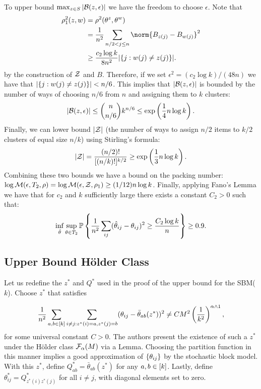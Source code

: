 \documentclass[11pt]{article}
\begin{document}
To upper bound $\max_{z \in S} |\mathcal{B}(z, \epsilon)|$ we have the freedom to choose $\epsilon$. Note that
\begin{equation}
\begin{aligned}
\rho_1^2(z, w) &= \rho^2(\theta^z, \theta^w) \\
               &= \frac{1}{n^2} \sum_{n/2 < j \leq n}\norm{B_{z(j)} - B_{w(j)}}^2 \\
               &\geq \frac{c_2 \log k}{8 n^2} |\set{j : w(j) \neq z(j)}|.
\end{aligned}
\end{equation}
by the construction of $\mathcal{Z}$ and $B$. Therefore, if we set $\epsilon^2 = (c_2 \log k)/(48 n)$ we have that $|\{j : w(j) \neq z(j)\}| < n/6$. This implies that $|\mathcal{B}(z, \epsilon)|$ is bounded by the number of ways of choosing $n/6$ from $n$ and assigning them to $k$ clusters:
\begin{equation}
|\mathcal{B}(z, \epsilon)| \leq {n \choose n/6} k^{n/6} \leq \exp\left(\frac{1}{4} n \log k\right).
\end{equation}
Finally, we can lower bound $|\mathcal{Z}|$ (the number of ways to assign $n/2$ items to $k/2$ clusters of equal size $n/k$) using Stirling's formula:
\begin{equation}
|\mathcal{Z}| = \frac{(n/2)!}{[(n/k)!]^{k/2}} \geq \exp\left(\frac{1}{3} n \log k\right).
\end{equation}
Combining these two bounds we have a bound on the packing number: $\log \mathcal{M}(\epsilon, T_2, \rho) = \log \mathcal{M}(\epsilon, \mathcal{Z}, \rho_1) \geq (1/12) n \log k$. Finally, applying Fano's Lemma we have that for $c_2$ and $k$ sufficiently large there exists a constant $C_2 > 0$ such that:
\begin{equation}\label{eq:sbmclust}
\inf_{\hat{\theta}} \sup_{\theta \in T_2} \mathbb{P} \left\{ \frac{1}{n^2} \sum_{ij} (\hat{\theta}_{ij} - \theta_{ij})^2 \geq \frac{C_2 \log k}{n} \right\} \geq 0.9.
\end{equation}

\subsection{Upper Bound H\"older Class} \label{sec:upper_hold}

Let us redefine the $z^\ast$ and $Q^\ast$ used in the proof of the upper bound for the SBM($k$). Choose $z^\ast$ that satisfies

\[
\frac{1}{n^2} \sum_{a,b\in \lbrack k\rbrack} \sum_{i\neq j: z^\ast(i)=a, z^\ast(j)=b} (\theta_{ij} -\bar{\theta}_{ab}(z^\ast)  )^2 \neq CM^2 \left( \frac{1}{k^2} \right)^{\alpha \wedge 1},
\]
for some universal constant $C >0$. The authors present the existence of such a $z^\ast$ under the H\"older class $\mathcal{F}_{\alpha}(M)$ via a Lemma. Choosing the partition function in this manner implies a good approximation of $\{\theta_{ij}\}$ by the stochastic block model. With this $z^\ast$, define $Q^\ast_{ab} = \bar{\theta}_{ab}(z^\ast)$ for any $a,b \in \lbrack k\rbrack$. Lastly, define $\theta^\ast_{ij} = Q^\ast_{z^\ast(i)z^\ast(j)}$ for all $i \neq j$, with diagonal elements set to zero.
\end{document}
